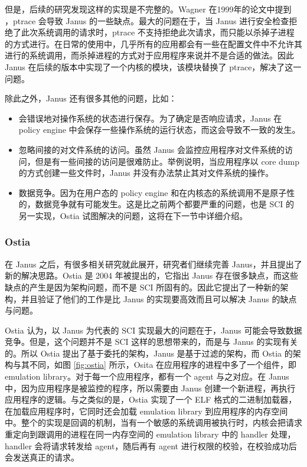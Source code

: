 \documentclass[final,12pt]{elsarticle}
\begin{document}
但是，后续的研究发现这样的实现是不完整的。Wagner 在1999年的论文中提到 \cite{wagner1999janus}，ptrace 会导致 Janus 的一些缺点。最大的问题在于，当 Janus 进行安全检查拒绝了此次系统调用的请求时，ptrace 不支持拒绝此次请求，而只能以杀掉子进程的方式进行。在日常的使用中，几乎所有的应用都会有一些在配置文件中不允许其进行的系统调用，而杀掉进程的方式对于应用程序来说并不是合适的做法。因此 Janus 在后续的版本中实现了一个内核的模块，该模块替换了 ptrace，解决了这一问题。

除此之外，Janus 还有很多其他的问题，比如：

\begin{itemize}
\item
会错误地对操作系统的状态进行保存。为了确定是否响应请求，Janus 在 policy engine 中会保存一些操作系统的运行状态，而这会导致不一致的发生。
\item
忽略间接的对文件系统的访问。虽然 Janus 会监控应用程序对文件系统的访问，但是有一些间接的访问是很难防止。举例说明，当应用程序以 core dump 的方式创建一些文件时，Janus 并没有办法禁止其对文件系统的操作。
\item
数据竞争。因为在用户态的 policy engine 和在内核态的系统调用不是原子性的，数据竞争就有可能发生。这是比之前两个都要严重的问题，也是 SCI 的另一实现，Ostia 试图解决的问题\cite{garfinkel2003traps}，这将在下一节中详细介绍。
\end{itemize}

\subsubsection{Ostia}
\label{sss:ostia}

在 Janus 之后，有很多相关研究就此展开，研究者们继续完善 Janus，并且提出了新的解决思路。Ostia \cite{garfinkel} 是 2004 年被提出的，它指出 Janus 存在很多缺点，而这些缺点的产生是因为架构问题，而不是 SCI 所固有的。因此它提出了一种新的架构，并且验证了他们的工作是比 Janus 的实现要高效而且可以解决 Janus 的缺点与问题。

Ostia 认为，以  Janus 为代表的 SCI 实现最大的问题在于，Janus 可能会导致数据竞争。但是，这个问题并不是 SCI 这样的思想带来的，而是与 Janus 的实现有关的。所以 Ostia 提出了基于委托的架构，Janus 是基于过滤的架构，而 Ostia 的架构与其不同，如图 \ref{fig:ostia} 所示，Osita 在应用程序的进程中多了一个组件，即 emulation library。对于每一个应用程序，都有一个 agent 与之对应。在 Janus 中，因为应用程序是被监控的程序，所以需要由 Janus 创建一个新进程，再执行应用程序的逻辑。与之类似的是，Ostia 实现了一个 ELF 格式的二进制加载器，在加载应用程序时，它同时还会加载 emulation library 到应用程序的内存空间中。整个的实现是回调的机制，当有一个敏感的系统调用被执行时，内核会把请求重定向到跟调用的进程在同一内存空间的 emulation library 中的 handler 处理，handler 会将请求转发给 agent，随后再有 agent 进行权限的校验，在校验成功后会发送真正的请求。
\end{document}
